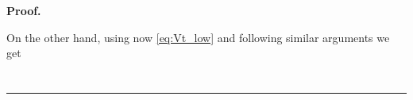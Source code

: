 \documentclass{tufte-handout}
\newcommand{\E}{\mathbb{E}} %
\newcommand{\R}{\mathbb{R}} %
\newcommand{\dif}{\mathrm{d}}
\newenvironment{pf}[1][Proof]{\textbf{#1.} }{\ \rule{0.5em}{0.5em}}
\begin{document}
\begin{pf}
		
		
%		
		
		On the other hand, using now \eqref{eq:Vt_low} and following similar arguments we get
		\begin{align*}

\end{align*}
\end{pf}
\end{document}
